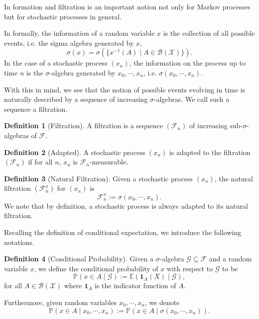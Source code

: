 \documentclass[]{article}
\theoremstyle{definition}
\theoremstyle{definition}
\newtheorem{definition}{Definition}[section]
\begin{document}
In formation and filtration is an important notion not only for Markov processes 
but for stochastic processes in general. 

In formally, the information of a random 
variable \(x\) is the collection of all possible events, i.e. the sigma algebra 
generated by \(x\), 
\[\sigma(x) = \sigma(\{x^{-1}(A) \mid A \in \mathcal{B}(\mathcal{X})\}).\]
In the case of a stochastic process \((x_n)\), the information on the process up 
to time \(n\) is the \(\sigma\)-algebra generated by \(x_0, \cdots, x_n\), 
i.e. \(\sigma(x_0, \cdots, x_n)\).

With this in mind, we see that the notion of possible events evolving in time 
is naturally described by a sequence of increasing \(\sigma\)-algebras. 
We call such a sequence a filtration.

\begin{definition}[Filtration]
  A filtration is a sequence \((\mathcal{F}_n)\) of 
  increasing sub-\(\sigma\)-algebras of \(\mathcal{F}\). 
\end{definition}

\begin{definition}[Adapted]
  A stochastic process \((x_n)\) is adapted to the filtration \((\mathcal{F}_n)\) if 
  for all \(n\), \(x_n\) is \(\mathcal{F}_n\)-measurable.
\end{definition}

\begin{definition}[Natural Filtration]
  Given a stochastic process \((x_n)\), the natural filtration \((\mathcal{F}^x_n)\) 
  for \((x_n)\) is 
  \[\mathcal{F}^x_n := \sigma(x_0 ,\cdots, x_n).\]
  We note that by definition, a stochastic process is always adapted to its natural 
  filtration.
\end{definition}

Recalling the definition of conditional expectation, we introduce the following 
notations. 

\begin{definition}[Conditional Probability]
  Given a \(\sigma\)-algebra \(\mathcal{G} \subseteq \mathcal{F}\) and a random 
  variable \(x\), we define the conditional probability of \(x\) with respect 
  to \(\mathcal{G}\) to be 
  \[\mathbb{P}(x \in A \mid \mathcal{G}) := \mathbb{E}(\mathbf{1}_A(X) \mid \mathcal{G}),\]
  for all \(A \in \mathcal{B}(\mathcal{X})\) where \(\mathbf{1}_A\) is the indicator 
  function of \(A\). 

  Furthermore, given random variables \(x_0, \cdots, x_n\), we denote 
  \[\mathbb{P}(x \in A \mid x_0, \cdots, x_n) := \mathbb{P}(x \in A \mid \sigma(x_0, \cdots, x_n)).\]
\end{definition}
\end{document}
